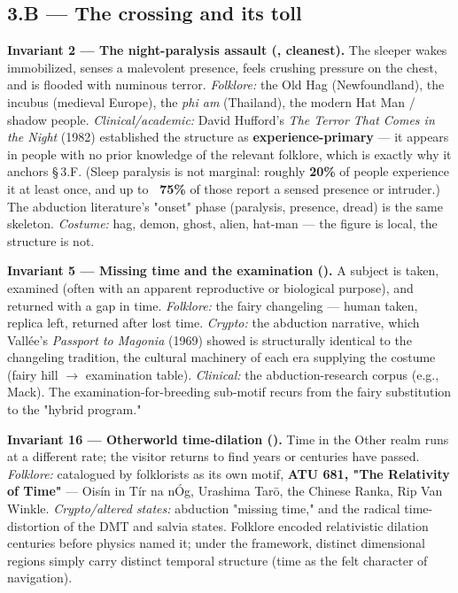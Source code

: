 \documentclass[11pt]{article}
\begin{document}
\subsection*{3.B --- The crossing and its toll}
\textbf{Invariant 2 --- The night-paralysis assault (\CIRCLE, cleanest).} The sleeper wakes immobilized, senses a malevolent presence, feels crushing pressure on the chest, and is flooded with numinous terror. \emph{Folklore:} the Old Hag (Newfoundland), the incubus (medieval Europe), the \emph{phi am} (Thailand), the modern Hat Man / shadow people. \emph{Clinical/academic:} David Hufford's \emph{The Terror That Comes in the Night} (1982) established the structure as \textbf{experience-primary} --- it appears in people with no prior knowledge of the relevant folklore, which is exactly why it anchors \S\,3.F. (Sleep paralysis is not marginal: roughly \textbf{20\%} of people experience it at least once, and up to \textbf{~75\%} of those report a sensed presence or intruder.) The abduction literature's "onset" phase (paralysis, presence, dread) is the same skeleton. \emph{Costume:} hag, demon, ghost, alien, hat-man --- the figure is local, the structure is not.

\textbf{Invariant 5 --- Missing time and the examination (\CIRCLE).} A subject is taken, examined (often with an apparent reproductive or biological purpose), and returned with a gap in time. \emph{Folklore:} the fairy changeling --- human taken, replica left, returned after lost time. \emph{Crypto:} the abduction narrative, which Vallée's \emph{Passport to Magonia} (1969) showed is structurally identical to the changeling tradition, the cultural machinery of each era supplying the costume (fairy hill $\rightarrow$ examination table). \emph{Clinical:} the abduction-research corpus (e.g., Mack). The examination-for-breeding sub-motif recurs from the fairy substitution to the "hybrid program."

\textbf{Invariant 16 --- Otherworld time-dilation (\CIRCLE).} Time in the Other realm runs at a different rate; the visitor returns to find years or centuries have passed. \emph{Folklore:} catalogued by folklorists as its own motif, \textbf{ATU 681, "The Relativity of Time"} --- Oisín in Tír na nÓg, Urashima Tar\={o}, the Chinese Ranka, Rip Van Winkle. \emph{Crypto/altered states:} abduction "missing time," and the radical time-distortion of the DMT and salvia states. Folklore encoded relativistic dilation centuries before physics named it; under the framework, distinct dimensional regions simply carry distinct temporal structure (time as the felt character of navigation).
\end{document}
